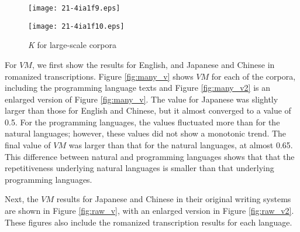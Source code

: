 \documentclass[english]{jnlp_1.4_rep}
\begin{document}
\begin{figure}[b]
\setlength{\captionwidth}{0.45\hsize}
\begin{minipage}[t]{0.45\hsize}
\begin{center}
\texttt{[image: 21-4ia1f9.eps]}
\end{center}
\caption{{\it K} for large-scale corpora}
\label{fig:many_k}
\end{minipage}
\hfill
\begin{minipage}[t]{0.45\hsize}
\begin{center}
\texttt{[image: 21-4ia1f10.eps]}
\end{center}
\label{fig:many_sh_k}
\end{minipage}
\end{figure}

For $\mathit{VM}$, we first show the results for English, and Japanese and Chinese 
in romanized transcriptions. Figure \ref{fig:many_v} shows 
$\mathit{VM}$ for each of the corpora, including the programming language texts 
and Figure \ref{fig:many_v2} is an enlarged version of Figure \ref{fig:many_v}. 
The value for Japanese was slightly larger than those for English and Chinese, 
but it almost converged to a value of 0.5. For the programming languages, 
the values fluctuated more than for the natural languages; 
however, these values did not show a monotonic trend. The final value of 
$\mathit{VM}$ was larger than that for the natural languages, at almost 0.65. 
This difference between natural and programming languages shows that that 
the repetitiveness underlying natural languages is smaller than 
that underlying programming languages.

Next, the $\mathit{VM}$ results for Japanese and Chinese in their original writing systems are shown in Figure \ref{fig:raw_v}, with an enlarged version in Figure \ref{fig:raw_v2}. These figures also include the romanized transcription results for each language. 
\end{document}
